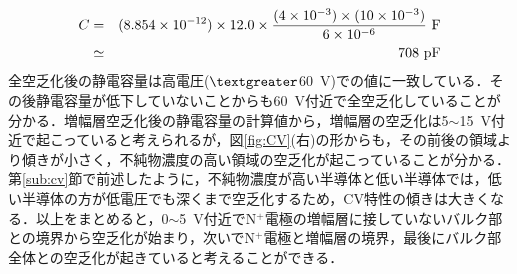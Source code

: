 \begin{eqnarray*}
C&=&(8.854\times10^{-12})\times12.0\times\frac{(4\times10^{-3})\times(10\times10^{-3})}{6\times10^{-6}}~{\rm F}\\
&\simeq&708~{\rm pF}
\end{eqnarray*}
全空乏化後の静電容量は高電圧($\textgreater$60~V)での値に一致している．その後静電容量が低下していないことからも60~V付近で全空乏化していることが分かる．増幅層空乏化後の静電容量の計算値から，増幅層の空乏化は5$\sim$15~V付近で起こっていると考えられるが，図\ref{fig:CV}(右)の形からも，その前後の領域より傾きが小さく，不純物濃度の高い領域の空乏化が起こっていることが分かる．第\ref{sub:cv}節で前述したように，不純物濃度が高い半導体と低い半導体では，低い半導体の方が低電圧でも深くまで空乏化するため，CV特性の傾きは大きくなる．以上をまとめると，0$\sim$5~V付近でN$^{+}$電極の増幅層に接していないバルク部との境界から空乏化が始まり，次いでN$^{+}$電極と増幅層の境界，最後にバルク部全体との空乏化が起きていると考えることができる．
